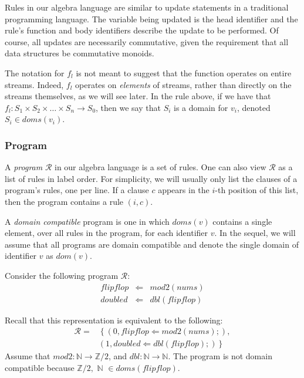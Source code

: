 Rules in our algebra language are similar to update statements in a traditional programming language.  The variable being updated is the head identifier and the rule's function and body identifiers describe the update to be performed.  Of course, all updates are necessarily commutative, given the requirement that all data structures be commutative monoids.

The notation for $f_l$ is not meant to suggest that the function operates on entire streams.  Indeed, $f_l$ operates on {\em elements} of streams, rather than directly on the streams themselves, as we will see later.  In the rule above, if we have that $f_l : S_1 \times S_2 \times \dots \times S_n \rightarrow S_0$, then we say that $S_i$ is a domain for $v_i$, denoted $S_i \in doms(v_i)$.

\subsubsection{Program}

A {\em program} $\mathcal{R}$ in our algebra language is a set of rules.  One can also view $\mathcal{R}$ as a list of rules in label order.  For simplicity, we will usually only list the clauses of a program's rules, one per line.  If a clause $c$ appears in the $i$-th position of this list, then the program contains a rule $(i,c)$.

A {\em domain compatible} program is one in which $doms(v)$ contains a single element, over all rules in the program, for each identifier $v$.  In the sequel, we will assume that all programs are domain compatible and denote the single domain of identifier $v$ as $dom(v)$.

\begin{example}
Consider the following program $\mathcal{R}$:
\begin{eqnarray*}
flipflop & \Leftarrow & mod2(nums) \\
doubled & \Leftarrow & dbl(flipflop)
\end{eqnarray*}

Recall that this representation is equivalent to the following:
\begin{equation*}
\begin{split}
\mathcal{R} = & \left\{(0, flipflop \Leftarrow mod2(nums);), \right. \\
& \left. (1, doubled \Leftarrow dbl(flipflop);) \right\}
\end{split}
\end{equation*}
Assume that $mod2 : \mathbb{N} \rightarrow \mathbb{Z}/2$, and $dbl : \mathbb{N} \rightarrow \mathbb{N}$.  The program is not domain compatible because $\mathbb{Z}/2, \,\, \mathbb{N} \,\, \in doms(flipflop)$.
\end{example}

